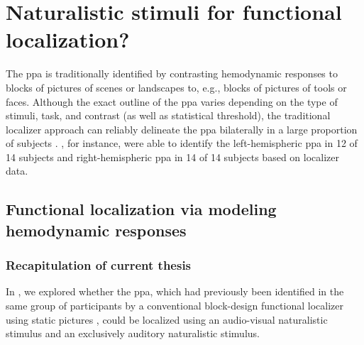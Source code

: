 




\pagebreak

\section{Naturalistic stimuli for functional localization?}



%
The \ac{ppa} is traditionally identified by contrasting hemodynamic responses to
blocks of pictures of scenes or landscapes to, e.g., blocks of pictures of tools
or faces.
%
Although the exact outline of the \ac{ppa} varies depending on the type of
stimuli, task, and contrast (as well as statistical threshold), the traditional
localizer approach can reliably delineate the \ac{ppa} bilaterally in a large
proportion of subjects \citep{zhen2017quantifying}.
%
\citet{sengupta2016extension}, for instance, were able to identify the
left-hemispheric \ac{ppa} in 12 of 14 subjects and right-hemispheric \ac{ppa} in
14 of 14 subjects based on localizer data.


\subsection{Functional localization via modeling hemodynamic responses}



\subsubsection{Recapitulation of current thesis}

In \citet{haeusler2022processing}, we explored whether the \ac{ppa}, which had
previously been identified in the same group of participants by a conventional
block-design functional localizer using static pictures
\citep{sengupta2016extension}, could be localized using an audio-visual
naturalistic stimulus and an exclusively auditory naturalistic stimulus.

